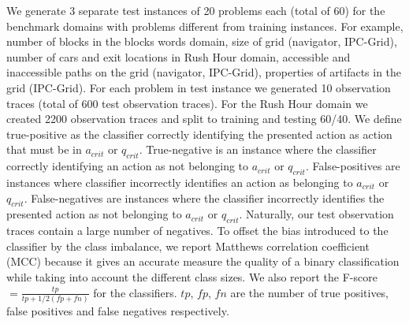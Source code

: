 \documentclass[letterpaper]{article}
\theoremstyle{plain}
\begin{document}
We generate 3 separate test instances of 20 problems each (total of 60) for the benchmark domains with problems different from training instances. For example, number of blocks in the blocks words domain, size of grid (navigator, IPC-Grid), number of cars and exit locations  in Rush Hour domain, accessible and inaccessible paths on the grid (navigator, IPC-Grid), properties of artifacts in the grid (IPC-Grid). For each problem in test instance we generated 10 observation traces (total of 600 test observation traces). For the Rush Hour domain we created 2200 observation traces and split to training and testing 60/40. We define true-positive as the classifier correctly identifying the presented action as action that must be in $a_{crit}$ or $q_{crit}$. True-negative is an instance where the classifier  correctly identifying an action as not belonging to $a_{crit}$ or $q_{crit}$. False-positives are instances where classifier incorrectly identifies an action as belonging to $a_{crit}$ or $q_{crit}$. False-negatives are instances where the classifier incorrectly identifies the presented action as not belonging to $a_{crit}$ or $q_{crit}$. Naturally, our test observation traces contain a large number of negatives. To offset the bias introduced to the classifier by the class imbalance, we report Matthews correlation coefficient (MCC) because it gives an accurate measure the quality of a binary classification while taking into account the different class sizes. We also report the F-score $= \frac{tp}{tp+1/2(fp+fn)}$ for the classifiers. $tp$, $fp$, $fn$ are the number of true positives, false positives and false negatives respectively.
\end{document}
